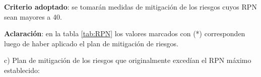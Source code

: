 \documentclass[11pt]{charter}
\begin{document}
\textbf{Criterio adoptado}: se tomarán medidas de mitigación de los riesgos cuyos RPN sean mayores a 40.

\textbf{Aclaración}: en la tabla \ref{tab:RPN} los valores marcados con (*) corresponden luego de haber aplicado el plan de mitigación de riesgos.






c) Plan de mitigación de los riesgos que originalmente excedían el RPN máximo establecido:
 
\end{document}
